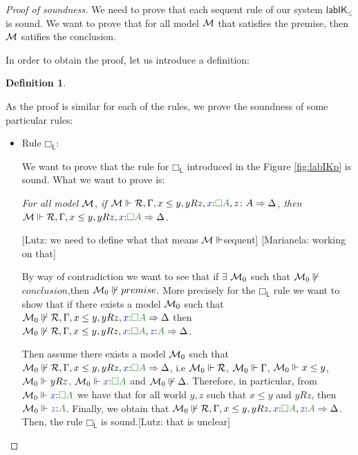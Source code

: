 \documentclass[a4paper]{article}
\theoremstyle{plain}
\theoremstyle{definition}
\newtheorem{definition}[theorem]{Definition}
\newcommand{\marianela}[1]{{\color{purple}[Marianela: #1]}}
\newcommand{\lutz}[1]{{\color{notgreen}[Lutz: #1]}}
\newcommand{\B}{\mathcal{R}}
\newcommand*{\lab}{\mathsf{lab}}
\newcommand*{\IK}{\mathsf{IK}}
\newcommand*{\labIKp}{\lab\IK_{\le}}
\newcommand*{\BOX}{\mathord{\Box}}
\newcommand*{\fm}[1]{{\color{notgreen}{#1}}}
\newcommand*{\lb}[1]{{\color{blue}{#1}}}
\newcommand*{\labels}[2]{\lb{#1}\mathord{:}\fm{#2}}
\newcommand*{\rn}[1]  {\ensuremath{\mathsf{#1}}}
\newcommand*{\llabrn}[2][]  {\rn{#2}_\rn{L#1}}%
\begin{document}
\begin{proof} [Proof of soundness]
	We need to prove that each sequent rule of our system $\labIKp$ is sound. We want to prove that for all model $\mathcal{M}$ that satisfies the premise, then $\mathcal{M}$ satifies the conclusion. 
	
	In order to obtain the proof, let us introduce a definition:
	
	\begin{definition}
		
	\end{definition}
	
	
	As the proof is similar for each of the rules, we prove the soundness of some particular rules:
	
	\begin{itemize}
		\item Rule $\llabrn\BOX$: 
		
		We want to prove that the rule for $\llabrn\BOX$ introduced in the Figure \ref{fig:labIKp} is sound. What we want to prove is:
		
		\begin{center}
			\emph{For all model $\mathcal{M}$, if $\M \Vdash \B,\Left, x \le y, yRz, \labels{x}{\BOX A}, z \colon A \Rightarrow \Right$, then $\M \Vdash \B, \Left, x \le y, yRz, \labels{x}{\BOX A} \Rightarrow \Right$.}
		\end{center}
		\lutz{we need to define what that means $\mathcal{M}\Vdash$sequent}
        \marianela{working on that}
        
		By way of contradiction we want to see that if $\exists$ $\mathcal{M}_{0}$ such that $\mathcal{M}_{0} \not \Vdash$ $conclusion$,then $\mathcal{M}_{0} \not \Vdash premise$. More precisely for the $\llabrn\BOX$ rule we want to show that if there exists a model $\mathcal{M}_{0}$ such that $\M_{0} \not \Vdash \B, \Left, x \le y, \break yRz, \labels{x}{\BOX A} \Rightarrow \Right$ then $\M_{0} \not \Vdash \B,\Left, x \le y, yRz, \labels{x}{\BOX A}, \labels{z}{A} \Rightarrow \Right$.
		
		Then assume there exists a model $\mathcal{M}_{0}$ such that $\M_{0} \not \Vdash \B, \Left, x \le y,\break yRz, \labels{x}{\BOX A} \Rightarrow \Right$, i.e $\M_{0} \Vdash \B$, $\mathcal{M}_{0} \Vdash \Gamma$, $\mathcal{M}_{0} \Vdash x \le y$, $ \mathcal{M}_{0} \Vdash yRz$, $\M_{0} \Vdash \labels{x}{\BOX A}$ and  $\mathcal{M}_{0} \not \Vdash \Delta$. Therefore, in particular, from $\M_{0} \Vdash \labels{x}{\BOX A}$ we have that for all world $y, z$ such that $x \le y$ and $yRz$, then $\M_{0} \Vdash \labels{z}{A}$. Finally, we obtain that $\M_{0} \not \Vdash \B, \Left, x \le y, yRz, \labels{x}{\BOX A}, \labels{z}{A} \Rightarrow \Right$. Then, the rule $\llabrn\BOX$ is sound.\lutz{that is unclear}
		

\end{itemize}
\end{proof}
\end{document}
